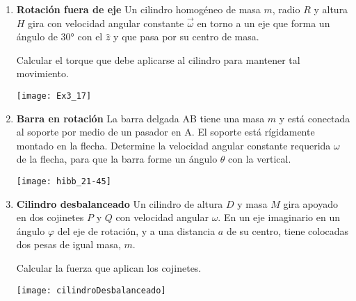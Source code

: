 \documentclass[11pt, spanish, a4paper, twoside]{article}
\begin{document}
\begin{enumerate}
	\item
	\begin{minipage}[t][3cm]{0.75\textwidth}
		\textbf{Rotación fuera de eje}
		Un cilindro homogéneo de masa \(m\), radio \(R\) y altura \(H\) gira con velocidad angular constante \(\vec{\omega}\) en torno a un eje que forma un ángulo de \ang{30;;} con el \(\hat{z}\) y que pasa por su centro de masa.
		\begin{tasks}
			\task Calcular el torque que debe aplicarse al cilindro para mantener tal movimiento.
		\end{tasks}
	\end{minipage}
	\begin{minipage}[c][2cm][t]{0.2\textwidth}
		\texttt{[image: Ex3\_17]}
	\end{minipage}



	\item 
	\begin{minipage}[t][4.5cm]{0.75\textwidth}
		\textbf{Barra en rotación}
		La barra delgada AB tiene una masa \(m\) y está conectada al soporte por medio de un pasador en A.
		El soporte está rígidamente montado en la flecha.
		Determine la velocidad angular constante requerida \(\omega\) de la flecha, para que la barra forme un ángulo \(\theta\) con la vertical.
	\end{minipage}
	\begin{minipage}[c][3cm][t]{0.2\textwidth}
		\texttt{[image: hibb\_21-45]}
	\end{minipage}


	\item 
	\begin{minipage}[t][3.5cm]{0.6\textwidth}
	\textbf{Cilindro desbalanceado}
		Un cilindro de altura \(D\) y masa \(M\) gira apoyado en dos cojinetes \(P\) y \(Q\) con velocidad angular \(\omega\).
		En un eje imaginario en un ángulo \(\varphi\) del eje de rotación, y a una distancia \(a\) de su centro, tiene colocadas dos pesas de igual masa, \(m\). 
		\begin{tasks} 
			\task Calcular la fuerza que aplican los cojinetes.
		\end{tasks}
	\end{minipage}
	\begin{minipage}[c][0.5cm][t]{0.35\textwidth}
		\texttt{[image: cilindroDesbalanceado]}
	\end{minipage}
		


\end{enumerate}
\end{document}
